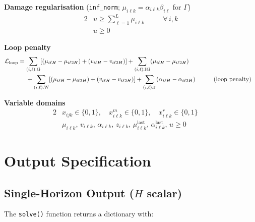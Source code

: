 \documentclass[11pt,a4paper]{article}
\begin{document}
\begin{small}
\vspace{0.3em}
\noindent\textbf{Damage regularisation} (\texttt{inf\_norm}; $\mu_{i\ell k}=\alpha_{i\ell k}\beta_{i\ell}$ for $\Gamma$)
\begin{alignat}{2}
  &u \geq \textstyle\sum_{\ell=1}^{L} \mu_{i\ell k}
  &&\quad\forall\,i,k \tag{damage reg.} \\
  &u \geq 0
  &&\tag{damage reg.\ non-neg.}
\end{alignat}

\vspace{0.3em}
\noindent\textbf{Loop penalty}
\begin{alignat}{2}
  &\mathcal{L}_{\mathrm{loop}} =
    \sum_{(i,\ell):\mathrm{G}}[(\mu_{i\ell H}-\mu_{i\ell 2H})+(v_{i\ell H}-v_{i\ell 2H})]
    + \sum_{(i,\ell):\mathrm{IG}}(\mu_{i\ell H}-\mu_{i\ell 2H}) \notag \\
  &\phantom{\mathcal{L}_{\mathrm{loop}} =\;}
    + \sum_{(i,\ell):\mathrm{W}}[(\mu_{i\ell H}-\mu_{i\ell 2H})+(v_{i\ell H}-v_{i\ell 2H})]
    + \sum_{(i,\ell):\Gamma}(\alpha_{i\ell H}-\alpha_{i\ell 2H})
  &&\tag{loop penalty}
\end{alignat}

\vspace{0.3em}
\noindent\textbf{Variable domains}
\begin{alignat}{2}
  &x_{ijk} \in \{0,1\},\quad x^m_{i\ell k} \in \{0,1\},\quad x^r_{i\ell k} \in \{0,1\}
  &&\tag{binary variables} \\
  &\mu_{i\ell k},\, v_{i\ell k},\, \alpha_{i\ell k},\, z_{i\ell k},\,
   \mu^{\mathrm{last}}_{i\ell k},\,
   \alpha^{\mathrm{last}}_{i\ell k},\, u \geq 0
  &&\tag{non-negativity}
\end{alignat}

\end{small}
\newpage

\section{Output Specification}

\subsection{Single-Horizon Output ($H$ scalar)}

The \texttt{solve()} function returns a dictionary with:
\end{document}
